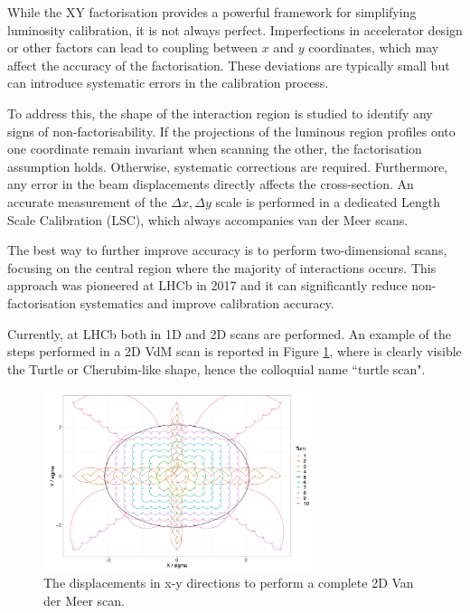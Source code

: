 While the XY factorisation provides a powerful framework for simplifying luminosity calibration, it is not always perfect. Imperfections in accelerator design or other factors can lead to coupling between $x$ and $y$ coordinates, which may affect the accuracy of the factorisation. These deviations are typically small but can introduce systematic errors in the calibration process.

To address this, the shape of the interaction region is studied to identify any signs of non-factorisability. If the projections of the luminous region profiles onto one coordinate remain invariant when scanning the other, the factorisation assumption holds. Otherwise, systematic corrections are required. Furthermore, any error in the beam displacements directly affects the cross-section. An accurate measurement of the $\Delta x, \Delta y$ scale is performed in a dedicated Length Scale Calibration (LSC), which always accompanies van der Meer scans. 

The best way to further improve accuracy is to perform two-dimensional scans, focusing on the central region where the majority of interactions occurs. This approach was pioneered at LHCb in 2017 and it can significantly reduce non-factorisation systematics and improve calibration accuracy\cite{Balagura_2021}.

Currently, at LHCb both in 1D and 2D scans are performed. An example of the steps performed in a 2D VdM scan is reported in Figure \ref{fig:vdm_steps_xy}, where is clearly visible the Turtle or Cherubim-like shape, hence the colloquial name ``turtle scan".

\begin{figure}
    \centering
    \includegraphics[width=0.7\textwidth]{figures/vdm_steps_xy.png}
    \caption{The displacements in x-y directions to perform a complete 2D Van der Meer scan.}
    \label{fig:vdm_steps_xy}
\end{figure}



